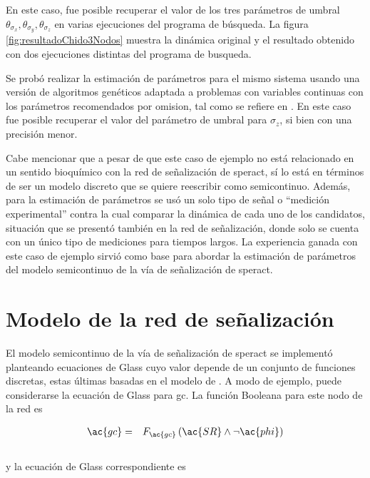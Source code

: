 En este caso, fue posible recuperar el valor de los tres parámetros de umbral $\theta_{\sigma_x}, \theta_{\sigma_y}, \theta_{\sigma_z}$ en varias ejecuciones del programa de búsqueda. La figura \ref{fig:resultadoChido3Nodos} muestra la dinámica original y el resultado obtenido con dos ejecuciones distintas del programa de busqueda.

Se probó realizar la estimación de parámetros para el mismo sistema usando una versión de algoritmos genéticos adaptada a problemas con variables continuas con los parámetros recomendados por omision, tal como se refiere en \citeauthor{Haupt1998} \citep{Haupt1998}. En este caso fue posible recuperar el valor del parámetro de umbral para $\sigma_z$, si bien con una precisión menor.

Cabe mencionar que a pesar de que este caso de ejemplo no está relacionado en un sentido bioquímico con la red de señalización de speract, sí lo está en términos de ser un modelo discreto que se quiere reescribir como semicontinuo. Además, para la estimación de parámetros se usó un solo tipo de señal o ``medición experimental'' contra la cual comparar la dinámica de cada uno de los candidatos, situación que se presentó también en la red de señalización, donde solo se cuenta con un único tipo de mediciones para tiempos largos. La experiencia ganada con este caso de ejemplo sirvió como base para abordar la estimación de parámetros del modelo semicontinuo de la vía de señalización de speract.

\section{Modelo de la red de señalización}

El modelo semicontinuo de la vía de señalización de speract se implementó planteando ecuaciones de Glass cuyo valor depende de un conjunto de funciones discretas, estas últimas basadas en el modelo de \citeauthor{Espinal2011} \citep{Espinal2011}.%
A modo de ejemplo, puede considerarse la ecuación de Glass para \acf{gc}. La función Booleana para este nodo de la red es

\begin{eqnarray}
\ac{gc} & = & F_{\ac{gc}} \left( \ac{SR} \wedge \neg \ac{phi} \right)
\end{eqnarray}
\\
y la ecuación de Glass correspondiente es

